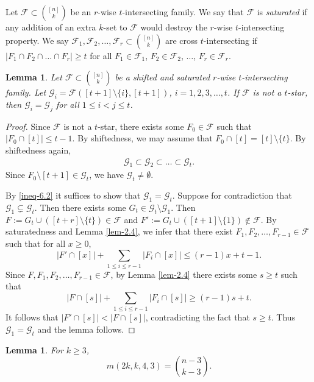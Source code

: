 \documentclass[11pt,a4paper]{article}
\newtheorem{lem}[thm]{Lemma}
\newtheorem{false statement}{False statement}
\theoremstyle{definition}
\def\hf{\mathcal{F}}
\def\hg{\mathcal{G}}
\begin{document}
Let $\hf\subset \binom{[n]}{k}$ be an $r$-wise $t$-intersecting family.
We say that $\hf$ is {\it saturated} if any addition of an extra $k$-set to $\hf$ would destroy the $r$-wise $t$-intersecting property. We say $\hf_1,\hf_2,\ldots,\hf_r\subset \binom{[n]}{k}$ are {cross $t$-intersecting} if $|F_1\cap F_2\cap\ldots \cap F_r|\geq t$ for all $F_1\in \hf_1$, $F_2\in \hf_2$, $\ldots$, $F_r\in \hf_r$.

\begin{lem}\label{lem-6.4}
Let $\hf\subset \binom{[n]}{k}$ be a shifted and saturated $r$-wise $t$-intersecting family. Let $\hg_i=\hf([t+1]\setminus \{i\},[t+1])$, $i=1,2,3,\ldots,t$. If $\hf$ is not a $t$-star, then $\hg_i=\hg_j$ for all $1\leq i<j\leq t$.
\end{lem}

\begin{proof}
Since $\hf$ is not a $t$-star, there exists some $F_0\in \hf$ such that $|F_0\cap [t]|\leq t-1$. By shiftedness, we may assume that $F_0\cap [t]= [t]\setminus \{t\}$.
By shiftedness again,
\begin{align}\label{ineq-6.2}
\hg_1\subset\hg_2\subset \ldots\subset \hg_{t}.
\end{align}
Since $F_0\setminus [t+1] \in \hg_t$, we have $\hg_t\neq \emptyset$.


By \eqref{ineq-6.2} it suffices to show that $\hg_1=\hg_t$. Suppose for contradiction that $\hg_1\subsetneq \hg_t$. Then there exists some $G_t\in \hg_t\setminus \hg_1$. Then $F:= G_t\cup ([t+r]\setminus \{t\})\in \hf$ and $F':=G_t\cup ([t+1]\setminus \{1\})\notin \hf$. By saturatedness and Lemma \ref{lem-2.4}, we infer that there exist $F_1,F_2,\ldots,F_{r-1}\in \hf$ such that for all  $x\geq 0$,
\[
|F'\cap [x]|+\sum_{1\leq i\leq r-1} |F_i\cap [x]| \leq  (r-1) x+t-1.
\]
Since $F,F_1,F_2,\ldots,F_{r-1}\in \hf$,
by Lemma \ref{lem-2.4} there exists some $s\geq t$ such that
\[
\left|F\cap [s]\right|+\sum_{1\leq i\leq r-1} |F_i\cap [s]| \geq  (r-1) s+t.
\]
It follows that $|F'\cap [s]| <|F\cap [s]|$, contradicting the fact that $s\geq t$. Thus $\hg_1=\hg_t$ and the lemma follows.
\end{proof}

\begin{lem}\label{lem-6.5}
For $k\geq 3$,
\[
m(2k,k,4,3)=\binom{n-3}{k-3}.
\]
\end{lem}
\end{document}
